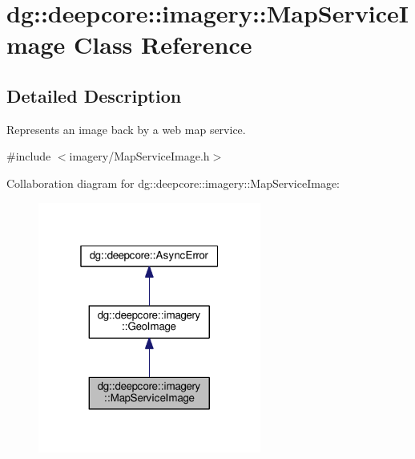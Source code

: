 \hypertarget{classdg_1_1deepcore_1_1imagery_1_1_map_service_image}{}\section{dg\+:\+:deepcore\+:\+:imagery\+:\+:Map\+Service\+Image Class Reference}
\label{classdg_1_1deepcore_1_1imagery_1_1_map_service_image}


\subsection{Detailed Description}
Represents an image back by a web map service. 

{\ttfamily \#include $<$imagery/\+Map\+Service\+Image.\+h$>$}



Collaboration diagram for dg\+:\+:deepcore\+:\+:imagery\+:\+:Map\+Service\+Image\+:
\nopagebreak
\begin{figure}[H]
\begin{center}
\leavevmode
\includegraphics[width=208pt]{classdg_1_1deepcore_1_1imagery_1_1_map_service_image__coll__graph}
\end{center}
\end{figure}
